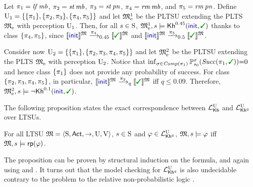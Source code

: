\begin{example}\label{ex:running:pkhunc}
  Let
  $\plan_1 = \lift\,\mobile$, $\plan_2 = \stairs\,\mobile$,
  $\plan_3 = \stairs\,\panic$, $\plan_4 = \ramp\,\mobile$, and
  $\plan_5 = \ramp\,\panic$.
  Define
  $\Unc_1 = \{ \{\plan_1\}, \{\plan_2,\plan_3\}, \{\plan_4,\plan_5\}\}$
  and let $\modelex^1$ be the PLTSU extending the PLTS $\modelex$ with
  perception $\Unc_1$.
  Then, for all $s\in\S$,
  $\modelex^1,s \models \kh^{0.45}(\init,\goal)$ 
  thanks to class $\{\plan_4,\plan_5\}$, since
  $\truthset{\model}{\init}\reach{\plan_4}_{0.45}\truthset{\model}{\goal}$
  and
  $\truthset{\model}{\init}\reach{\plan_5}_{0.5}\truthset{\model}{\goal}$.

  Consider now
  $\Unc_2 = \{ \{\plan_1\}, \{\plan_2,\plan_3,\plan_4,\plan_5\}\}$
  and let $\modelex^2$ be the PLTSU extending the PLTS $\modelex$ with
  perception $\Unc_2$.
  Notice that
  $\inf_{\strat\in\Comp(\plan_1)}\Prob^\strat_{s_0}(\Succ(\plan_1,\goal)){=}0$
  and hence class $\{\plan_1\}$ does not provide any probability of
  success.
  For class $\{\plan_2,\plan_3,\plan_4,\plan_5\}$, in particular,
  $\truthset{\model}{\init}\reach{\plan_2}_q\truthset{\model}{\goal}$
  iff $q\leq 0.09$.
  Therefore, $\modelex^2, s \models \neg \kh^{0.1}(\init,\goal)$.
\end{example}


The following proposition states the exact correspondence between
$\Khunc$ and $\PKhunc$ over LTSUs.
%
%
\begin{proposition}\label{prop:Khunc:PKhunc}
    For all LTSU $\model = \tup{\S,\Act,\ra,\Unc,\V}$, $s\in\S$ and
    $\varphi\in\PKhunc$,
    $\model,s\models\varphi$ iff $\model,s\models\fgetprob(\varphi)$.
\end{proposition}

The proposition can be proven by structural induction on
the formula, and again using  and .
It turns out that the model checking for $\PKhunc$ is also undecidable
contrary to the \PTIME problem to the relative non-probabilistic logic
\cite{DF23}.


